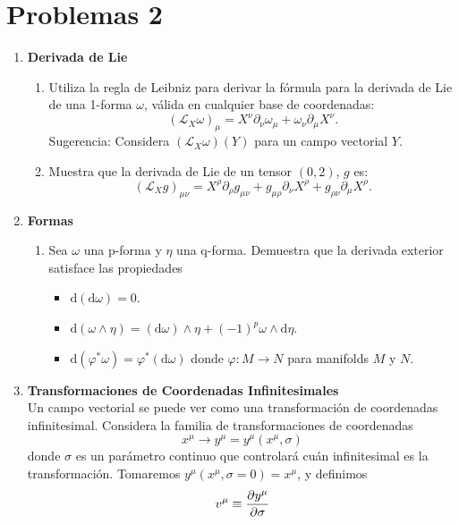 \documentclass[../main]{subfiles}
\begin{document}
\section*{Problemas 2}
\begin{enumerate}
    \item \textbf{Derivada de Lie}
    \begin{enumerate}
        \item Utiliza la regla de Leibniz para derivar la fórmula para la derivada de Lie de una 1-forma $\omega$, válida en cualquier base de coordenadas:
        \begin{equation}
            (\mathcal{L}_X \omega)_{\mu}=X^{\nu} \partial_{\nu} \omega_{\mu}+\omega_{\nu} \partial_{\mu} X^{\nu}.
        \end{equation}
        Sugerencia: Considera $(\mathcal{L}_X \omega)(Y)$ para un campo vectorial $Y$.
        \item Muestra que la derivada de Lie de un tensor $(0, 2)$, $g$ es:
        \begin{equation}
            (\mathcal{L}_X g)_{\mu\nu}=X^{\rho} \partial_{\rho} g_{\mu\nu}+g_{\mu\rho}\partial_{\nu}X^{\rho}+g_{\rho\nu}\partial_{\mu}X^{\rho}.
        \end{equation}
    \end{enumerate}
    \item \textbf{Formas} 
    \begin{enumerate}
        \item Sea $\omega$ una p-forma y $\eta$ una q-forma. Demuestra que la derivada exterior satisface las propiedades 
        \begin{itemize}
            \item $\mathrm{d}(\mathrm{d} \omega)=0$.
            \item $\mathrm{d}(\omega \wedge \eta)=(\mathrm{d} \omega)\wedge \eta+(-1)^p \omega \wedge \mathrm{d}\eta$.
            \item $\mathrm{d}(\varphi^* \omega)=\varphi^*(\mathrm{d}\omega)$ donde $\varphi: M \rightarrow N$ para manifolds $M$ y $N$.
        \end{itemize}
    \end{enumerate}
    \item \textbf{Transformaciones de Coordenadas Infinitesimales}\\
    Un campo vectorial se puede ver como una transformación de coordenadas infinitesimal. Considera la familia de transformaciones de coordenadas 
    \begin{equation}
        x^{\mu} \rightarrow y^{\mu}=y^{\mu}(x^{\mu}, \sigma)
    \end{equation} 
    donde $\sigma$ es un parámetro continuo que controlará cuán infinitesimal es la transformación. Tomaremos $y^{\mu}(x^{\mu}, \sigma=0)=x^{\mu}$, y definimos 
    \begin{equation}
        v^{\mu} \equiv \pdv{y^{\mu}}{\sigma}
    \end{equation}


\end{enumerate}
\end{document}
